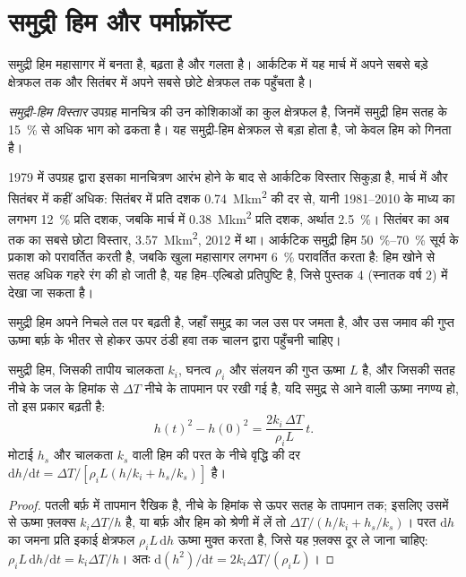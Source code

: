\section{समुद्री हिम और पर्माफ़्रॉस्ट}\label{sec:b3:glaciology:sea-ice}

समुद्री हिम महासागर में बनता है, बढ़ता है और गलता है। आर्कटिक में यह
मार्च में अपने सबसे बड़े क्षेत्रफल तक और सितंबर में अपने सबसे छोटे क्षेत्रफल तक पहुँचता है।

\begin{definition}[समुद्री-हिम विस्तार]\label{def:b3:glaciology:sea-ice}
\emph{समुद्री-हिम विस्तार} उपग्रह मानचित्र की उन कोशिकाओं का
कुल क्षेत्रफल है, जिनमें समुद्री हिम सतह के \qty{15}{\percent} से अधिक भाग को ढकता है।
यह समुद्री-हिम क्षेत्रफल से बड़ा होता है,
जो केवल हिम को गिनता है।
\end{definition}

1979 में उपग्रह द्वारा इसका मानचित्रण आरंभ होने के बाद से आर्कटिक विस्तार सिकुड़ा है, मार्च में
और सितंबर में कहीं अधिक: सितंबर में प्रति दशक \qty{0.74}{\mega km^2} की दर से,
यानी 1981--2010 के माध्य का लगभग \qty{12}{\percent} प्रति दशक, जबकि
मार्च में \qty{0.38}{\mega km^2} प्रति दशक, अर्थात \qty{2.5}{\percent}।
सितंबर का अब तक का सबसे छोटा विस्तार, \qty{3.57}{\mega km^2}, 2012 में था। आर्कटिक समुद्री
हिम \qtyrange{50}{70}{\percent} सूर्य के प्रकाश को परावर्तित करती है, जबकि खुला महासागर लगभग
\qty{6}{\percent} परावर्तित करता है: हिम खोने से सतह अधिक गहरे रंग की हो जाती है,
यह हिम--एल्बिडो प्रतिपुष्टि है, जिसे पुस्तक 4 (स्नातक वर्ष 2) में देखा जा सकता है।

समुद्री हिम अपने निचले तल पर बढ़ती है, जहाँ समुद्र का जल उस पर जमता है, और उस जमाव की गुप्त
ऊष्मा बर्फ़ के भीतर से होकर ऊपर ठंडी हवा तक चालन द्वारा पहुँचनी चाहिए।

\begin{theorem}[स्टीफ़न का नियम]\label{thm:b3:glaciology:stefan}
समुद्री हिम, जिसकी तापीय चालकता $k_i$, घनत्व $\rho_i$ और
संलयन की गुप्त ऊष्मा $L$ है, और जिसकी सतह नीचे के जल के हिमांक से $\Delta T$ नीचे के तापमान पर रखी गई है,
यदि समुद्र से आने वाली ऊष्मा
नगण्य हो, तो इस प्रकार बढ़ती है:
\[
h(t)^2 - h(0)^2 = \frac{2k_i\,\Delta T}{\rho_iL}\,t .
\]
मोटाई $h_s$ और चालकता $k_s$ वाली हिम की परत के नीचे वृद्धि की दर
$\mathrm dh/\mathrm dt = \Delta T/[\rho_iL(h/k_i + h_s/k_s)]$ है।
\end{theorem}

\begin{proof}
पतली बर्फ़ में तापमान रैखिक है, नीचे के हिमांक से
ऊपर सतह के तापमान तक; इसलिए उसमें से ऊष्मा फ़्लक्स
$k_i\Delta T/h$ है, या बर्फ़ और हिम को श्रेणी में लें तो $\Delta T/(h/k_i +
h_s/k_s)$। परत $\mathrm dh$ का जमना प्रति
इकाई क्षेत्रफल $\rho_iL\,\mathrm dh$ ऊष्मा मुक्त करता है, जिसे यह फ़्लक्स दूर ले जाना चाहिए: $\rho_iL\,\mathrm dh/\mathrm dt
= k_i\Delta T/h$। अतः $\mathrm d(h^2)/\mathrm dt = 2k_i\Delta T/(\rho_iL)$।
\end{proof}

